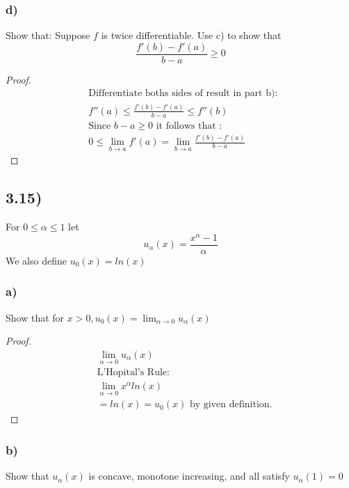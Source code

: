 \documentclass[12pt]{article}
\begin{document}
\subsubsection*{d)}
Show that:
Suppose $f$ is twice differentiable. Use c) to show that $$\frac{f'(b)-f'(a)}{b-a} \ge 0$$


\begin{proof}
\begin{align*} 
& \text{Differentiate boths sides of result in part b): }\\
& f''(a) \le \frac{f'(b) - f'(a)}{b-a} \le f''(b)\\
& \text{Since } b-a \ge 0 \text{ it follows that :}\\
& 0 \le \lim_{b\to a}f'(a) = \lim_{b\to a}\frac{f'(b)-f'(a)}{b-a}
\end{align*}
\end{proof}

\subsection*{3.15)}

For $0 \le \alpha \le 1$ let $$ u_\alpha(x) = \frac{x^{\alpha} - 1}{\alpha}$$
We also define $u_0(x) = ln(x)$

\subsubsection*{a)}

Show that for $x > 0, u_0(x) = \lim_{\alpha\to 0}u_\alpha(x)$

\begin{proof}
\begin{align*} 
& \lim_{\alpha\to 0}u_\alpha(x)\\
& \text{L'Hopital's Rule: }\\
& \lim_{\alpha\to 0}x^{\alpha}ln(x)\\
& = ln(x) = u_0(x) \text{ by given definition.}
\end{align*}
\end{proof}

\subsubsection*{b)}

Show that $u_\alpha(x)$ is concave, monotone increasing, and all satisfy $u_\alpha(1) = 0$
\end{document}
